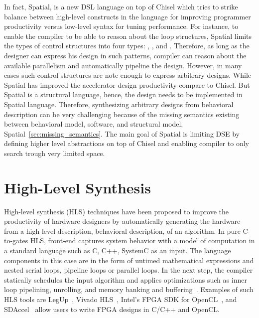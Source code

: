 In fact, Spatial, is a new DSL language on top of Chisel which tries to strike balance between high-level constructs in the language for improving programmer productivity versus low-level syntax for tuning performance. 
For instance, to enable the compiler to be able to reason about the loop structures, Spatial limits the types of control structures into four types: , ,  and .
Therefore, as long as the designer can express his design in such patterns, compiler can reason about the available parallelism and automatically pipeline the design.
However, in many cases such control structures are note enough to express arbitrary designs.
While Spatial has improved the accelerator design productivity compare to Chisel.
But Spatial is a structural language, hence, the design needs to be implemented in Spatial language.
Therefore, synthesizing arbitrary designs from behavioral description can be very challenging because of the missing semantics existing between behavioral model, software, and structural model, Spatial~\ref{sec:missing_semantics}.
The main goal of Spatial is limiting DSE by defining higher level abstractions on top of Chisel and enabling compiler to only search trough very limited space.

\section{High-Level Synthesis}

High-level synthesis (HLS) techniques have been proposed to improve the productivity of hardware designers by automatically generating the hardware from a high-level description, behavioral description, of an algorithm.
In pure C-to-gates HLS, front-end captures system behavior with a model of computation in a standard language such as C, C++, SystemC as an input. The language components in this case are in the form of untimed mathematical expressions and nested serial loops, pipeline loops or parallel loops.
In the next step, the compiler statically schedules the input algorithm and applies optimizations such as inner loop pipelining, unrolling, and memory banking and buffering~\cite{chung_micro_2010, lee_1989_new, paulin_1989_force}.
Examples of such HLS tools are LegUp~\cite{canis_2011_legup}, Vivado HLS~\cite{vivadohls}, Intel’s FPGA SDK for OpenCL~\cite{opencl_sdk}, and SDAccel~\cite{sdaccel} allow users to write FPGA designs in C/C++ and OpenCL.

